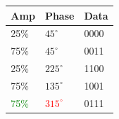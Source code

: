 \documentclass[]{beamer}
\begin{document}
\begin{frame}
\begin{columns}[T]
\begin{column}[T]{5cm}
        \end{column}
        \begin{column}[T]{5cm}
            \begin{table}[]
                \begin{tabular}{lll}
                    Amp  & Phase & Data \\
                    \hline
                    25\% & $45^{\circ}$  & 0000 \\
                    75\% & $45^{\circ}$  & 0011 \\
                    25\% & $225^{\circ}$ & 1100 \\
                    75\% & $135^{\circ}$ & 1001 \\
                    \textcolor{green}{75\%} & \textcolor{red}{$315^{\circ}$} & \textcolor{cyan!50}{0111} \\
                \end{tabular}
            \end{table}
        \end{column}
    \end{columns}
\end{frame}
\end{document}
